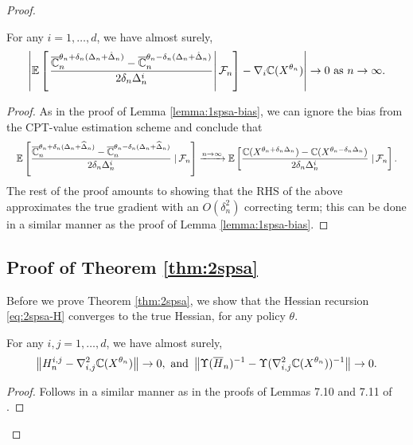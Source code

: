 \documentclass{article}
\numberwithin{equation}{section}
\numberwithin{theorem}{section}
\begin{document}
\begin{proof}
\begin{lemma}
\label{lemma:2spsa-grad}
For any $i = 1,\ldots,d$, we have almost surely,  
\begin{align}
\left| \mathbb{E}\left[\left.\dfrac{\overline {\mathbb{C}}_n^{\theta_n + \delta_n (\Delta_n + \hat \Delta_n)} -\overline {\mathbb{C}}_n^{\theta_n - \delta_n (\Delta_n + \hat \Delta_n)}}{2 \delta_n \Delta_n^i}\right| \mathcal{F}_n \right] - \nabla_i \mathbb{C}(X^{\theta_n}) \right| \rightarrow 0 \text{ as } n\rightarrow\infty.
\end{align} 
\end{lemma}
\begin{proof}
As in the proof of Lemma \ref{lemma:1spsa-bias}, we can ignore the bias from the CPT-value estimation scheme and conclude that
\begin{align*}
\quad&\mathbb{E}\left[\dfrac{\overline {\mathbb{C}}_n^{\theta_n + \delta_n (\Delta_n+\widehat\Delta_n)} -\overline {\mathbb{C}}_n^{\theta_n - \delta_n (\Delta_n+\widehat\Delta_n)}}{2 \delta_n \Delta_n^i} \left.\right| \mathcal{F}_n\right] 
\xrightarrow{n\rightarrow\infty}  \mathbb{E}\left[\dfrac{\mathbb{C}(X^{\theta_n + \delta_n \Delta_n}) -\mathbb{C}(X^{\theta_n - \delta_n \Delta_n})}{2 \delta_n \Delta_n^i} \left.\right| \mathcal{F}_n\right].  
\end{align*}
The rest of the proof amounts to showing that the RHS of the above approximates the true gradient with an $O(\delta_n^2)$ correcting term; this can be done in a similar manner as the proof of Lemma \ref{lemma:1spsa-bias}.
\end{proof}

\subsection*{Proof of Theorem \ref{thm:2spsa}}

Before we prove Theorem \ref{thm:2spsa}, we show that the Hessian recursion \eqref{eq:2spsa-H} converges to the true Hessian, for any policy $\theta$.

\begin{lemma}
\label{lemma:h-est}
For any $i, j= 1,\ldots,d$, we have almost surely,  
$$\left \| H^{i, j}_n - \nabla^2_{i,j} \mathbb{C}(X^{\theta_n}) \right \| \rightarrow 0,
\text{ and }\left \| \Upsilon(\overline H_n)^{-1} - \Upsilon(\nabla^2_{i,j} \mathbb{C}(X^{\theta_n}))^{-1} \right \| \rightarrow 0.
$$
\end{lemma}
\begin{proof}
 Follows in a similar manner as in the proofs of Lemmas 7.10 and 7.11 of \cite{Bhatnagar13SR}.
\end{proof}


\end{proof}
\end{document}
